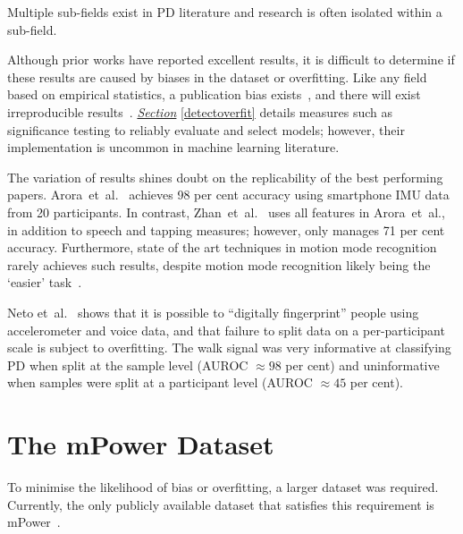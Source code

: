 \documentclass[12pt, twoside]{book}
\begin{document}
\begin{highlight}
Multiple sub-fields exist in PD literature and research is often isolated within a sub-field.
\end{highlight}

Although prior works have reported excellent results, it is difficult to determine if these results are caused by biases in the dataset or overfitting. Like any field based on empirical statistics, a publication bias exists~\cite{publicationbias}, and there will exist irreproducible results~\cite{replicability}. \textit{\hyperref[detectoverfit]{Section}} \ref{detectoverfit} details measures such as significance testing to reliably evaluate and select models; however, their implementation is uncommon in machine learning literature. 

The variation of results shines doubt on the replicability of the best performing papers. Arora~et~al.~\cite{arora2014high} achieves 98 per cent accuracy using smartphone IMU data from 20 participants. In contrast, Zhan~et~al.~\cite{zhan2016high} uses all features in Arora~et~al., in addition to speech and tapping measures; however, only manages 71 per cent accuracy. Furthermore, state of the art techniques in motion mode recognition rarely achieves such results, despite motion mode recognition likely being the `easier' task~\cite{motionmoderecognition}. 

Neto et~al.~\cite{mpowerneto2017analysis} shows that it is possible to ``digitally fingerprint'' people using accelerometer and voice data, and that failure to split data on a per-participant scale is subject to overfitting. The walk signal was very informative at classifying PD when split at the sample level (AUROC $\approx 98$ per cent) and uninformative when samples were split at a participant level (AUROC $\approx 45$ per cent). 
 \newpage



\section{The mPower Dataset}
\label{mpower}
To minimise the likelihood of bias or overfitting, a larger dataset was required. Currently, the only publicly available dataset that satisfies this requirement is mPower~\cite{mpower}. 
\end{document}
